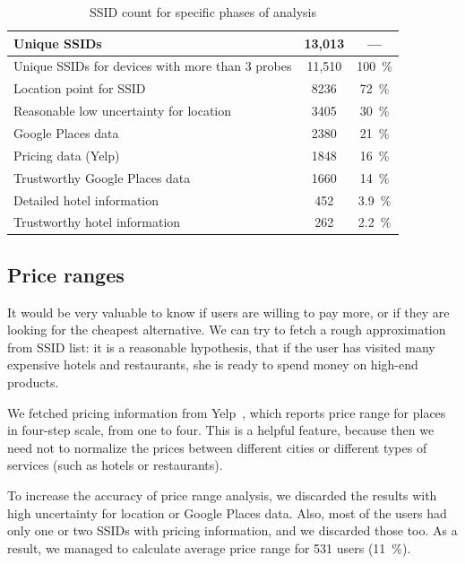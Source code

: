 \documentclass[12pt,a4paper,oneside,pdftex]{report}
\begin{document}
\begin{table}[h]
    \center
    \begin{tabular}{|l|c|c|}
        \hline
        Unique SSIDs                            & 13,013 & --- \\ \hline
        Unique SSIDs for devices with more than 3 probes  & 11,510 & 100~\% \\ \hline
        Location point for SSID                 & 8236 & 72~\%  \\ \hline
        Reasonable low uncertainty for location & 3405 & 30~\%  \\ \hline
        Google Places data                      & 2380 & 21~\%  \\ \hline
        Pricing data (Yelp)                     & 1848 & 16~\%  \\ \hline
        Trustworthy Google Places data          & 1660 & 14~\%  \\ \hline
        Detailed hotel information              & 452  & 3.9~\% \\ \hline
        Trustworthy hotel information           & 262  & 2.2~\% \\ \hline
    \end{tabular}
    \caption{SSID count for specific phases of analysis}
    \label{tab:stage_counts}
\end{table}

\subsection{Price ranges}
\label{subsec:practical_prices}

It would be very valuable to know if users are willing to pay more, or if they are looking for the cheapest alternative. We can try to fetch a rough approximation from SSID list: it is a reasonable hypothesis, that if the user has visited many expensive hotels and restaurants, she is ready to spend money on high-end products.

We fetched pricing information from Yelp~\cite{yelp}, which reports price range for places in four-step scale, from one to four. This is a helpful feature, because then we need not to normalize the prices between different cities or different types of services (such as hotels or restaurants).

To increase the accuracy of price range analysis, we discarded the results with high uncertainty for location or Google Places data. Also, most of the users had only one or two SSIDs with pricing information, and we discarded those too. As a result, we managed to calculate average price range for 531 users (11~\%).
\end{document}
